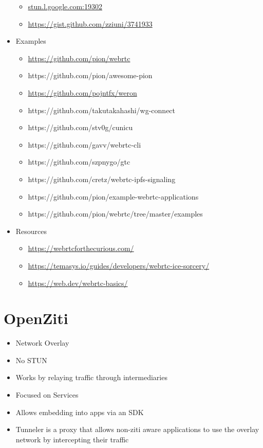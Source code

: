 \begin{itemize}
  \begin{itemize}
  \tightlist
  \item
    \href{http://stun.l.google.com:19302/}{stun.l.google.com:19302}
  \item
    \url{https://gist.github.com/zziuni/3741933}
  \end{itemize}
\item
  Examples

  \begin{itemize}
  \tightlist
  \item
    \url{https://github.com/pion/webrtc}
  \item
    https://github.com/pion/awesome-pion
  \item
    \url{https://github.com/pojntfx/weron}
  \item
    https://github.com/takutakahashi/wg-connect
  \item
    https://github.com/stv0g/cunicu
  \item
    https://github.com/gavv/webrtc-cli
  \item
    https://github.com/szpnygo/gtc
  \item
    https://github.com/cretz/webrtc-ipfs-signaling
  \item
    https://github.com/pion/example-webrtc-applications
  \item
    https://github.com/pion/webrtc/tree/master/examples
  \end{itemize}
\item
  Resources

  \begin{itemize}
  \tightlist
  \item
    \url{https://webrtcforthecurious.com/}
  \item
    \url{https://temasys.io/guides/developers/webrtc-ice-sorcery/}
  \item
    \href{https://web.dev/webrtc-basics/\#toc-rtcpeerconnection}{https://web.dev/webrtc-basics/}
  \end{itemize}
\end{itemize}

\hypertarget{openziti}{%
\section{OpenZiti}\label{openziti}}

\begin{itemize}
\tightlist
\item
  Network Overlay
\item
  No STUN
\item
  Works by relaying traffic through intermediaries
\item
  Focused on Services
\item
  Allows embedding into apps via an SDK
\item
  Tunneler is a proxy that allows non-ziti aware applications to use the
  overlay network by intercepting their traffic
\end{itemize}

